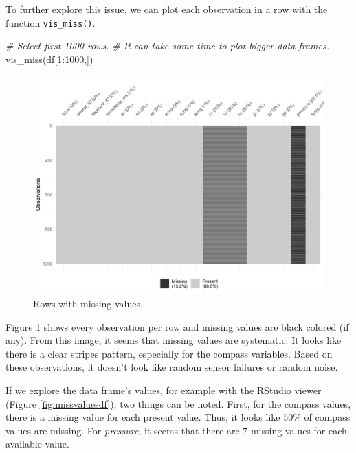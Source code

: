 \documentclass[
  11pt,
]{krantz}
\newenvironment{Shaded}{\begin{snugshade}}{\end{snugshade}}
\newcommand{\CommentTok}[1]{\textcolor[rgb]{0.37,0.37,0.37}{\textit{#1}}}
\newcommand{\DecValTok}[1]{\textcolor[rgb]{0.06,0.06,0.06}{#1}}
\newcommand{\FunctionTok}[1]{\textcolor[rgb]{0,0,0}{#1}}
\newcommand{\NormalTok}[1]{#1}
\newcommand{\SpecialCharTok}[1]{\textcolor[rgb]{0,0,0}{#1}}
\begin{document}
To further explore this issue, we can plot each observation in a row with the function \texttt{vis\_miss()}.

\begin{Shaded}
\begin{Highlighting}[]
\CommentTok{\# Select first 1000 rows.}
\CommentTok{\# It can take some time to plot bigger data frames.}
\FunctionTok{vis\_miss}\NormalTok{(df[}\DecValTok{1}\SpecialCharTok{:}\DecValTok{1000}\NormalTok{,])}
\end{Highlighting}
\end{Shaded}

\begin{figure}

{\centering \includegraphics[width=1\linewidth]{images/vismiss} 

}

\caption{Rows with missing values.}\label{fig:vismiss}
\end{figure}

Figure \ref{fig:vismiss} shows every observation per row and missing values are black colored (if any). From this image, it seems that missing values are systematic. It looks like there is a clear stripes pattern, especially for the compass variables. Based on these observations, it doesn't look like random sensor failures or random noise.

If we explore the data frame's values, for example with the RStudio viewer (Figure \ref{fig:missvaluesdf}), two things can be noted. First, for the compass values, there is a missing value for each present value. Thus, it looks like \(50\%\) of compass values are missing. For \emph{pressure}, it seems that there are \(7\) missing values for each available value.
\end{document}
